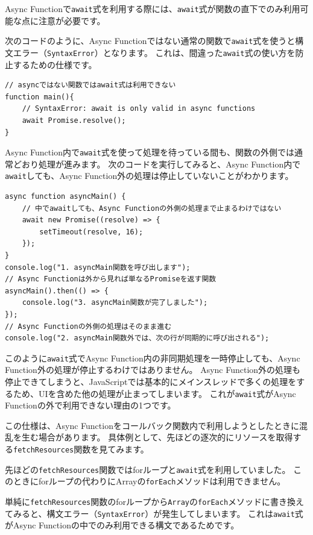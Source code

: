 Async Functionで\texttt{await}式を利用する際には、\texttt{await}式が関数の直下でのみ利用可能な点に注意が必要です。

次のコードのように、Async
Functionではない通常の関数で\texttt{await}式を使うと構文エラー（\texttt{SyntaxError}）となります。
これは、間違った\texttt{await}式の使い方を防止するための仕様です。

\begin{lstlisting}
// asyncではない関数ではawait式は利用できない
function main(){
    // SyntaxError: await is only valid in async functions
    await Promise.resolve();
}
\end{lstlisting}

Async
Function内で\texttt{await}式を使って処理を待っている間も、関数の外側では通常どおり処理が進みます。
次のコードを実行してみると、Async
Function内で\texttt{await}しても、Async
Function外の処理は停止していないことがわかります。

\begin{lstlisting}
async function asyncMain() {
    // 中でawaitしても、Async Functionの外側の処理まで止まるわけではない
    await new Promise((resolve) => {
        setTimeout(resolve, 16);
    });
}
console.log("1. asyncMain関数を呼び出します");
// Async Functionは外から見れば単なるPromiseを返す関数
asyncMain().then(() => {
    console.log("3. asyncMain関数が完了しました");
});
// Async Functionの外側の処理はそのまま進む
console.log("2. asyncMain関数外では、次の行が同期的に呼び出される");
\end{lstlisting}

このように\texttt{await}式でAsync
Function内の非同期処理を一時停止しても、Async
Function外の処理が停止するわけではありません。 Async
Function外の処理も停止できてしまうと、JavaScriptでは基本的にメインスレッドで多くの処理をするため、UIを含めた他の処理が止まってしまいます。
これが\texttt{await}式がAsync
Functionの外で利用できない理由の1つです。

この仕様は、Async
Functionをコールバック関数内で利用しようとしたときに混乱を生む場合があります。
具体例として、先ほどの逐次的にリソースを取得する\texttt{fetchResources}関数を見てみます。

先ほどの\texttt{fetchResources}関数ではforループと\texttt{await}式を利用していました。
このときにforループの代わりにArrayの\texttt{forEach}メソッドは利用できません。

単純に\texttt{fetchResources}関数のforループから\texttt{Array}の\texttt{forEach}メソッドに書き換えてみると、構文エラー（\texttt{SyntaxError}）が発生してしまいます。
これは\texttt{await}式がAsync
Functionの中でのみ利用できる構文であるためです。


